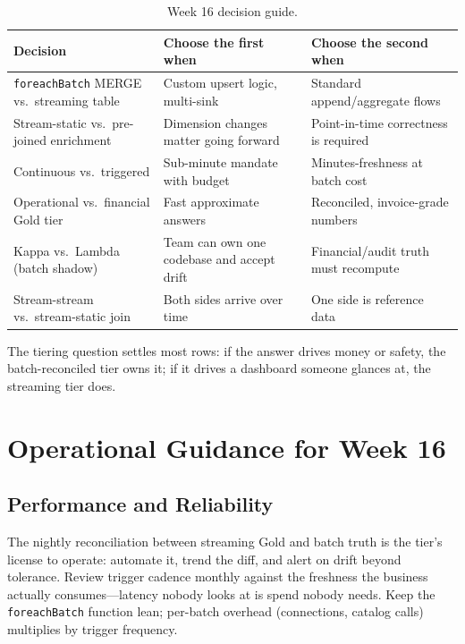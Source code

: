 \begin{table}[H]
\centering
\small
\begin{tabular}{@{}p{3.4cm}p{4.4cm}p{4.6cm}@{}}
\toprule
\textbf{Decision} & \textbf{Choose the first when} & \textbf{Choose the second when} \\
\midrule
\texttt{foreachBatch} MERGE vs.\ streaming table & Custom upsert logic, multi-sink & Standard append/aggregate flows \\
Stream-static vs.\ pre-joined enrichment & Dimension changes matter going forward & Point-in-time correctness is required \\
Continuous vs.\ triggered & Sub-minute mandate with budget & Minutes-freshness at batch cost \\
Operational vs.\ financial Gold tier & Fast approximate answers & Reconciled, invoice-grade numbers \\
Kappa vs.\ Lambda (batch shadow) & Team can own one codebase and accept drift & Financial/audit truth must recompute \\
Stream-stream vs.\ stream-static join & Both sides arrive over time & One side is reference data \\
\bottomrule
\end{tabular}
\caption{Week 16 decision guide.}
\label{tab:ch16-decisions}
\end{table}

The tiering question settles most rows: if the answer drives money or safety, the batch-reconciled tier owns it; if it drives a dashboard someone glances at, the streaming tier does.

\section{Operational Guidance for Week 16}
%
\subsection{Performance and Reliability}
The nightly reconciliation between streaming Gold and batch truth is the tier's license to operate: automate it, trend the diff, and alert on drift beyond tolerance. Review trigger cadence monthly against the freshness the business actually consumes---latency nobody looks at is spend nobody needs. Keep the \texttt{foreachBatch} function lean; per-batch overhead (connections, catalog calls) multiplies by trigger frequency.

